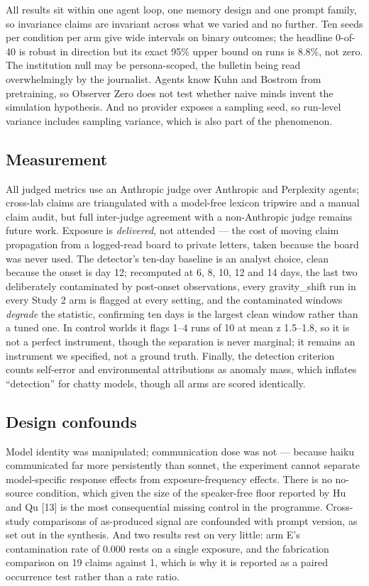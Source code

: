\documentclass[pdflatex,sn-basic]{sn-jnl}
\begin{document}
All results sit within one agent loop, one memory design and one
prompt family, so invariance claims are invariant across what we varied and no further.
Ten seeds per condition per arm give wide intervals on binary outcomes; the headline
0-of-40 is robust in direction but its exact 95\% upper bound on runs is 8.8\%, not zero.
The institution null may be persona-scoped, the bulletin being read overwhelmingly by the journalist.
Agents know Kuhn and Bostrom from pretraining, so Observer Zero does not test whether
naive minds invent the simulation hypothesis. And no provider exposes a sampling seed, so
run-level variance includes sampling variance, which is also part of the phenomenon.

\hypertarget{measurement}{%
\subsection{Measurement}\label{measurement}}

All judged metrics use an Anthropic judge over Anthropic and Perplexity
agents; cross-lab claims are triangulated with a model-free lexicon tripwire and a manual
claim audit, but full inter-judge agreement with a non-Anthropic judge remains future
work. Exposure is \emph{delivered}, not attended --- the cost of moving claim propagation from a
logged-read board to private letters, taken because the board was never used. The
detector's ten-day baseline is an analyst choice, clean because the onset is day 12; recomputed
at 6, 8, 10, 12 and 14 days, the last two deliberately contaminated by post-onset observations,
every gravity\_shift run in every Study 2 arm is flagged at every setting, and the contaminated
windows \emph{degrade} the statistic, confirming ten days is the largest clean window rather than a
tuned one. In control worlds it flags 1--4 runs of 10 at mean \textbar z\textbar{} 1.5--1.8, so it is not a perfect
instrument, though the separation is never marginal; it remains an instrument we specified, not a
ground truth. Finally, the detection criterion counts self-error and environmental attributions as
anomaly mass, which inflates ``detection'' for chatty models, though all arms are scored
identically.

\hypertarget{design-confounds}{%
\subsection{Design confounds}\label{design-confounds}}

Model identity was manipulated; communication dose was not --- because
haiku communicated far more persistently than sonnet, the experiment cannot separate
model-specific response effects from exposure-frequency effects. There is no no-source
condition, which given the size of the speaker-free floor reported by Hu and Qu {[}13{]} is
the most consequential missing control in the programme. Cross-study comparisons of as-produced signal are confounded with prompt version, as set out in the synthesis. And two
results rest on very little: arm E's contamination rate of 0.000 rests on a single
exposure, and the fabrication comparison on 19 claims against 1, which is why it is
reported as a paired occurrence test rather than a rate ratio.
\end{document}
